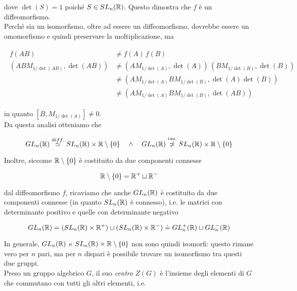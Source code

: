 dove $ \det(S) = 1 $ poiché $ S \in SL_{n} (\mathbb{R}) $. Questo dimostra che $ f $ è un diffeomorfismo.\\
Perché sia un isomorfismo, oltre ad essere un diffeomorfismo, dovrebbe essere un omomorfismo e quindi preservare la moltiplicazione, ma

\begin{align}
	\begin{split}
		f(A B) &\neq f(A) \, f(B)\\
		\left( A B M_{1/\det(A B)}, \det(A B) \right) &\neq \left( A M_{1/\det(A)},\det(A) \right) \, \left( B M_{1/\det(B)},\det(B) \right) \\
		&\neq \left( A M_{1/\det(A)} B M_{1/\det(B)},\det(A) \det(B) \right) \\
		&\neq \left( A M_{1/\det(A)} B M_{1/\det(B)},\det(A B) \right)
	\end{split}
\end{align}

in quanto $ [B, M_{1/\det(A)}] \neq 0 $.\\
Da questa analisi otteniamo che

\begin{equation}
	GL_{n}(\R) \stackrel{diff.}{\simeq} SL_{n}(\R) \times \R \setminus \{0\} %
	\quad \wedge \quad %
	GL_{n}(\R) \stackrel{iso.}{\not\simeq} SL_{n}(\R) \times \R \setminus \{0\}
\end{equation}

Inoltre, siccome $ \mathbb{R} \setminus \{0\} $ è costituito da due componenti connesse

\begin{equation}
	\mathbb{R} \setminus \{0\} = \mathbb{R}^{+} \sqcup \mathbb{R}^{-}
\end{equation}

dal diffeomorfismo $ f $, ricaviamo che anche $ GL_{n}(\mathbb{R}) $ è costituito da due componenti connesse (in quanto $ SL_{n}(\mathbb{R}) $ è connesso), i.e. le matrici con determinante positivo e quelle con determinante negativo

\begin{equation}
	GL_{n}(\R) = (SL_{n}(\R) \times \R^{+}) \sqcup (SL_{n}(\R) \times \R^{-}) %
	\doteq GL_{n}^{+}(\R) \sqcup GL_{n}^{-}(\R)
\end{equation}

In generale, $ GL_{n}(\mathbb{R}) $ e $ SL_{n}(\mathbb{R}) \times \mathbb{R} \setminus \{0\} $ non sono quindi isomorfi: questo rimane vero per $ n $ pari, ma per $ n $ dispari è possibile trovare un isomorfismo tra questi due gruppi.\\
Preso un gruppo algebrico $ G $, il suo \textit{centro} $ Z(G) $ è l'insieme  degli elementi di $ G $ che commutano con tutti gli altri elementi, i.e.

